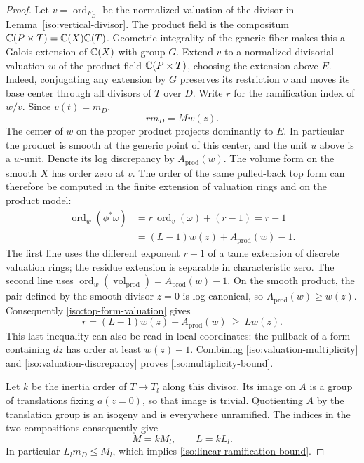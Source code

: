 \begin{proof}
Let \(v=\operatorname{ord}_{F_D}\) be the normalized valuation of
the divisor in Lemma~\ref{iso:vertical-divisor}.  The product field is
the compositum \(\mathbb C(P\times T)=\mathbb C(X)\mathbb C(T)\).  Geometric integrality
of the generic fiber makes this a Galois extension of \(\mathbb C(X)\) with
group \(G\).  Extend \(v\) to a
normalized divisorial valuation \(w\) of the product field
\(\mathbb C(P\times T)\), choosing the extension above \(E\).  Indeed,
conjugating any extension by \(G\) preserves its restriction \(v\)
and moves its base center through all divisors of \(T\) over \(D\).
Write \(r\) for the ramification index of \(w/v\).  Since
\(v(t)=m_D\),
\begin{equation}\label{iso:valuation-multiplicity}
                         r m_D=Mw(z).
\end{equation}
The center of \(w\) on the proper product projects dominantly to \(E\).
In particular the product is smooth at the generic point of this
center, and the unit \(u\) above is a \(w\)-unit.
Denote its log discrepancy by \(A_{\mathrm{prod}}(w)\).
The volume form on the smooth \(X\) has order zero at \(v\).
The order of the same pulled-back top form can therefore be computed
in the finite extension of valuation rings and on the product model:
\begin{equation}\label{iso:top-form-valuation}
 \begin{aligned}
 \operatorname{ord}_w(\phi^*\omega)
   &=r\,\operatorname{ord}_v(\omega)+(r-1)=r-1\\
   &=(L-1)w(z)+A_{\mathrm{prod}}(w)-1.
 \end{aligned}
\end{equation}
The first line uses the different exponent \(r-1\) of a tame
extension of discrete valuation rings; the residue extension is
separable in characteristic zero.  The second line uses
\(\operatorname{ord}_w(\operatorname{vol}_{\mathrm{prod}})
=A_{\mathrm{prod}}(w)-1\).
On the smooth product, the pair defined by the smooth divisor
\(z=0\) is log canonical, so \(A_{\mathrm{prod}}(w)\ge w(z)\).
Consequently \eqref{iso:top-form-valuation} gives
\begin{equation}\label{iso:valuation-discrepancy}
 r=(L-1)w(z)+A_{\mathrm{prod}}(w)
                       \ \ge\ Lw(z).
\end{equation}
This last inequality can also be read in local coordinates:
the pullback of a form containing \(dz\) has order at least
\(w(z)-1\).
Combining \eqref{iso:valuation-multiplicity} and
\eqref{iso:valuation-discrepancy} proves
\eqref{iso:multiplicity-bound}.

Let \(k\) be the inertia order of \(T\to T_l\) along this divisor.
Its image on \(A\) is a group of translations fixing \(a(z=0)\),
so that image is trivial.  Quotienting \(A\) by the translation
group is an isogeny and is everywhere unramified.  The indices in
the two compositions consequently give
\[
                          M=kM_l,\qquad L=kL_l.
\]
In particular \(L_lm_D\le M_l\), which implies
\eqref{iso:linear-ramification-bound}.
\end{proof}

